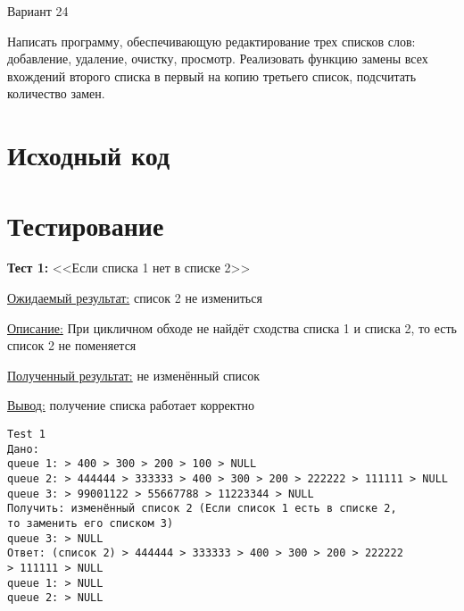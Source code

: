 \documentclass[12pt, a4paper]{article}
\begin{document}
\maketitle
\setcounter{page}{2}

\renewcommand{\contentsname}{Содержание}
\tableofcontents
\newpage

\labheading


\labreport

\begin{center}
    Вариант 24
\end{center}
Написать программу, обеспечивающую редактирование трех списков слов: добавление, удаление, очистку, просмотр. Реализовать функцию замены всех вхождений второго списка в первый на копию третьего список, подсчитать количество замен.

\section{Исходный код}


\section{Тестирование}

\textbf{Тест 1:} <<Если списка 1 нет в списке 2>>

\underline{Ожидаемый результат:} список 2 не измениться

\underline{Описание:} При цикличном обходе не найдёт сходства списка 1 и списка 2, то есть список 2 не поменяется

\underline{Полученный результат:} не изменённый список

\underline{Вывод:} получение списка работает корректно

\begin{tcolorbox}
\begin{verbatim}
Test 1
Дано:
queue 1: > 400 > 300 > 200 > 100 > NULL
queue 2: > 444444 > 333333 > 400 > 300 > 200 > 222222 > 111111 > NULL
queue 3: > 99001122 > 55667788 > 11223344 > NULL
Получить: изменённый список 2 (Если список 1 есть в списке 2,
то заменить его списком 3)
queue 3: > NULL
Ответ: (список 2) > 444444 > 333333 > 400 > 300 > 200 > 222222
> 111111 > NULL
queue 1: > NULL
queue 2: > NULL
\end{verbatim}
\end{tcolorbox}
\end{document}
